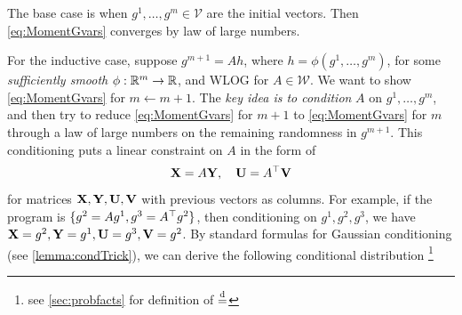 \documentclass[main.tex]{subfiles}
\begin{document}
The base case is when $g^{1},\ldots,g^{m}\in\mathcal{V}$ are the initial vectors. Then \cref{eq:MomentGvars} converges by law of large numbers.

For the inductive case, suppose $g^{m+1}=Ah$, where $h=\phi(g^{1},\ldots,g^{m})$, for some \emph{sufficiently smooth} $\phi:\mathbb{R}^{m}\to\mathbb{R}$, and WLOG for $A \in \mathcal W$.
We want to show \cref{eq:MomentGvars} for $m\gets m+1$. The \emph{key idea is to condition} $A$ on $g^{1},\ldots,g^{m}$, and then try to reduce \cref{eq:MomentGvars} for $m+1$ to \cref{eq:MomentGvars} for $m$ through a law of large numbers on the remaining randomness in $g^{m+1}$.
This conditioning puts a linear constraint on $A$ in the form of
\[
\mathbf{X}=A\mathbf{Y},\quad\mathbf{U}=A^{\top}\mathbf{V}
\]
for matrices $\mathbf{X},\mathbf{Y},\mathbf{U},\mathbf{V}$ with previous vectors as columns.
For example, if the program is $\{g^2 = A g^1, g^3 = A^\top g^2\}$, then conditioning on $g^1, g^2, g^3$, we have $\mathbf{X} = g^2, \mathbf{Y} = g^1, \mathbf{U}=g^3, \mathbf{V}=g^2$.
By standard formulas for Gaussian conditioning (see \cref{lemma:condTrick}), we can derive the following conditional distribution%
\footnote{see \cref{sec:probfacts} for definition of $\overset{\mathrm{d}}{=}$}
\end{document}
